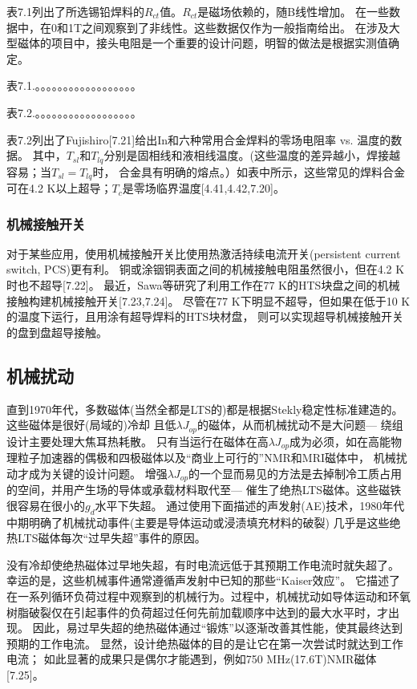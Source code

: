 表7.1列出了所选锡铅焊料的$R_{ct}$值。$R_{ct}$是磁场依赖的，随B线性增加。
在一些数据中，在0和1T之间观察到了非线性。这些数据仅作为一般指南给出。
在涉及大型磁体的项目中，接头电阻是一个重要的设计问题，明智的做法是根据实测值确定。


表7.1.。。。。。。。。。。。。。。。。。。

表7.2.。。。。。。。。。。。。。。。。。。

表7.2列出了Fujishiro[7.21]给出In和六种常用合金焊料的零场电阻率 vs. 温度的数据。
其中，$T_{sl}$和$T_{lq}$分别是固相线和液相线温度。(这些温度的差异越小，焊接越容易；当$T_{sl} = T_{lq}$时，
合金具有明确的熔点。）如表中所示，这些常见的焊料合金可在4.2 K以上超导；$T_c$是零场临界温度[4.41,4.42,7.20]。

\subsubsection*{机械接触开关}
对于某些应用，使用机械接触开关比使用热激活持续电流开关(persistent current switch, PCS)更有利。
铜或涂铟铜表面之间的机械接触电阻虽然很小，但在4.2 K时也不超导[7.22]。
最近，Sawa等研究了利用工作在77 K的HTS块盘之间的机械接触构建机械接触开关[7.23,7.24]。
尽管在77 K下明显不超导，但如果在低于10 K的温度下运行，且用涂有超导焊料的HTS块材盘，
则可以实现超导机械接触开关的盘到盘超导接触。

\subsection{机械扰动}
直到1970年代，多数磁体(当然全都是LTS的)都是根据Stekly稳定性标准建造的。这些磁体是很好(局域的)冷却
且低$\lambda J_{op}$的磁体，从而机械扰动不是大问题---
绕组设计主要处理大焦耳热耗散。
只有当运行在磁体在高$\lambda J_{op}$成为必须，如在高能物理粒子加速器的偶极和四极磁体以及“商业上可行的”NMR和MRI磁体中，
机械扰动才成为关键的设计问题。
增强$\lambda J_{op}$的一个显而易见的方法是去掉制冷工质占用的空间，并用产生场的导体或承载材料取代至---
催生了绝热LTS磁体。这些磁铁很容易在很小的$g_d$水平下失超。
通过使用下面描述的声发射(AE)技术，1980年代中期明确了机械扰动事件(主要是导体运动或浸渍填充材料的破裂)
几乎是这些绝热LTS磁体每次“过早失超”事件的原因。


没有冷却使绝热磁体过早地失超，有时电流远低于其预期工作电流时就失超了。
幸运的是，这些机械事件通常遵循声发射中已知的那些“Kaiser效应”。
它描述了在一系列循环负荷过程中观察到的机械行为。过程中，机械扰动如导体运动和环氧树脂破裂仅在引起事件的负荷超过任何先前加载顺序中达到的最大水平时，才出现。
因此，易过早失超的绝热磁体通过“锻炼”以逐渐改善其性能，使其最终达到预期的工作电流。
显然，设计绝热磁体的目的是让它在第一次尝试时就达到工作电流；
如此显著的成果只是偶尔才能遇到，例如750 MHz(17.6T)NMR磁体[7.25]。


